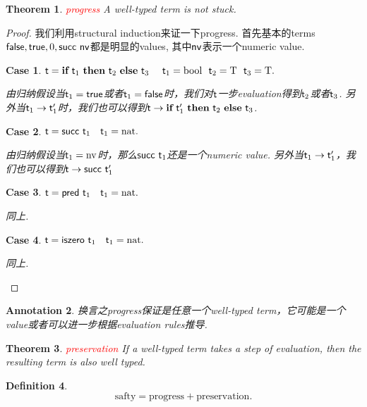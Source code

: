 \documentclass{article}
\theoremstyle{plain}
\newtheorem{theorem}{Theorem}
\newtheorem{definition}[theorem]{Definition}
\newtheorem{annotation}[theorem]{Annotation}
\newtheorem{case}{Case}
\theoremstyle{nonumberplain}
\newtheorem{proof}{Proof}
\newcommand{\term}[1]{\ensuremath\mathsf{#1}}
\newcommand{\true}{\term{true}}
\newcommand{\false}{\term{false}}
\newcommand{\ifelse}[3]{\ensuremath{\textbf{if}~#1~\textbf{then}~#2~\textbf{else}~#3}}
\newcommand{\succt}[1]{\term{succ}~#1}
\newcommand{\pred}[1]{\term{pred}~#1}
\newcommand{\iszero}[1]{\term{iszero}~#1}
\newcommand{\redt}[1]{\textcolor{red}{#1}}
\begin{document}
\begin{theorem}
\rm \redt{progress} A well-typed term is not stuck.
\end{theorem}

\begin{proof}
\rm 我们利用structural induction来证一下progress. 首先基本的terms $\false, \true, 0, \succt{\term{nv}}$都是明显的values, 其中$\term{nv}$表示一个numeric value. 

\begin{case}
$\term{t} = \ifelse{\term{t}_1}{\term{t}_2}{\term{t}_3} ~~~~ \term{t}_1 = \text{bool} ~~ \term{t}_2 = \text{T} ~~ \term{t}_3 = \text{T}.$

由归纳假设当$\term{t}_1 = \true$或者$\term{t}_1 = \false$时，我们对$\term{t}$一步evaluation得到$\term{t}_2$或者$\term{t}_3$.  另外当$\term{t}_1 \to \term{t}_1'$时，我们也可以得到$\term{t} \to \ifelse{\term{t}_1'}{\term{t}_2}{\term{t}_3}$. 
\end{case} 

\begin{case}
$\term{t} = \succt{\term{t}_1} ~~~ \term{t}_1 = \text{nat}.$

由归纳假设当$\term{t}_1 = \text{nv}$时，那么$\succt{\term{t}_1}$还是一个numeric value. 另外当$\term{t}_1 \to \term{t}_1'$，我们也可以得到$\term{t} \to \succt{\term{t}_1'}$
\end{case} 

\begin{case}
$\term{t} = \pred{\term{t}_1}~~~ \term{t}_1 = \text{nat}.$

同上.
\end{case} 

\begin{case}
$\term{t} = \iszero{\term{t}_1}~~~ \term{t}_1 = \text{nat}.$

同上.
\end{case}
\end{proof}

\begin{annotation}
\rm 换言之progress保证是任意一个well-typed term，它可能是一个value或者可以进一步根据evaluation rules推导. 
\end{annotation}


\begin{theorem}
\rm \redt{preservation} If a well-typed term takes a step of  evaluation, then the resulting term is also well typed. 
\end{theorem}

\begin{definition}
\rm
$$
\text{safty} = \text{progress} + \text{preservation}.
$$
\end{definition}
\end{document}
